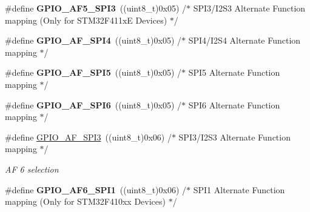\begin{DoxyCompactItemize}
\#define {\bfseries G\+P\+I\+O\+\_\+\+A\+F5\+\_\+\+S\+P\+I3}~((uint8\+\_\+t)0x05)  /$\ast$ S\+P\+I3/\+I2\+S3 Alternate Function mapping (\+Only for S\+T\+M32\+F411x\+E Devices) $\ast$/
\item 
\mbox{\label{group___g_p_i_o___alternat__function__selection__define_ga360cce3ae41ef808ae4e759cdc472caa}} 
\#define {\bfseries G\+P\+I\+O\+\_\+\+A\+F\+\_\+\+S\+P\+I4}~((uint8\+\_\+t)0x05)  /$\ast$ S\+P\+I4/\+I2\+S4 Alternate Function mapping $\ast$/
\item 
\mbox{\label{group___g_p_i_o___alternat__function__selection__define_gaaa0510969bcb57bd404dc2683278c4f8}} 
\#define {\bfseries G\+P\+I\+O\+\_\+\+A\+F\+\_\+\+S\+P\+I5}~((uint8\+\_\+t)0x05)  /$\ast$ S\+P\+I5 Alternate Function mapping      $\ast$/
\item 
\mbox{\label{group___g_p_i_o___alternat__function__selection__define_ga6cfa78426cbd6734da5be6ff43464fd2}} 
\#define {\bfseries G\+P\+I\+O\+\_\+\+A\+F\+\_\+\+S\+P\+I6}~((uint8\+\_\+t)0x05)  /$\ast$ S\+P\+I6 Alternate Function mapping      $\ast$/
\item 
\mbox{\label{group___g_p_i_o___alternat__function__selection__define_gad6e716ad894aa5299273541c6966864a}} 
\#define \mbox{\hyperlink{group___g_p_i_o___alternat__function__selection__define_gad6e716ad894aa5299273541c6966864a}{G\+P\+I\+O\+\_\+\+A\+F\+\_\+\+S\+P\+I3}}~((uint8\+\_\+t)0x06)  /$\ast$ S\+P\+I3/\+I2\+S3 Alternate Function mapping $\ast$/
\begin{DoxyCompactList}\small\item\em AF 6 selection ~\newline
 \end{DoxyCompactList}\item 
\mbox{\label{group___g_p_i_o___alternat__function__selection__define_ga512ece0f473dd9963298d38e10ab41a6}} 
\#define {\bfseries G\+P\+I\+O\+\_\+\+A\+F6\+\_\+\+S\+P\+I1}~((uint8\+\_\+t)0x06)  /$\ast$ S\+P\+I1 Alternate Function mapping (\+Only for S\+T\+M32\+F410xx Devices) $\ast$/
\item 

\end{DoxyCompactItemize}
